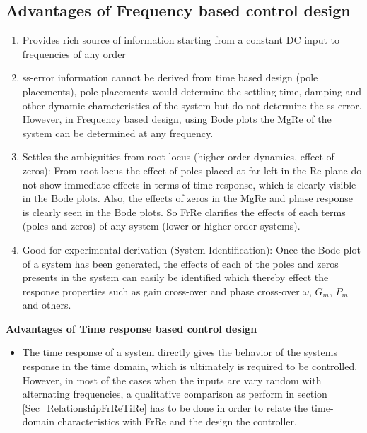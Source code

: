 \subsection{Advantages of Frequency based control design}

\begin{enumerate}
	\item Provides rich source of information starting from a constant DC input to frequencies of any order
	\item ss-error information cannot be derived from time based design (pole placements), pole placements would determine the settling time, damping and other dynamic characteristics of the system but do not determine the ss-error. However, in Frequency based design, using Bode plots the MgRe of the system can be determined at any frequency.
	\item Settles the ambiguities from root locus (higher-order dynamics, effect of zeros): From root locus the effect of poles placed at far left in the Re plane do not show immediate effects in terms of time response, which is clearly visible in the Bode plots. Also, the effects of zeros in the MgRe and phase response is clearly seen in the Bode plots. So FrRe clarifies the effects of each terms (poles and zeros) of any system (lower or higher order systems).
	\item Good for experimental derivation (System Identification): Once the Bode plot of a system has been generated, the effects of each of the poles and zeros presents in the system can easily be identified which thereby effect the response properties such as gain cross-over and phase cross-over $\omega$, $G_m$, $P_m$ and others.
\end{enumerate}

\textbf{Advantages of Time response based control design}
\begin{itemize}
	\item The time response of a system directly gives the behavior of the systems response in the time domain, which is ultimately is required to be controlled. However, in most of the cases when the inputs are vary random with alternating frequencies, a qualitative comparison as perform in section \ref{Sec_RelationshipFrReTiRe} has to be done in order to relate the time-domain characteristics with FrRe and the design the controller.
\end{itemize}